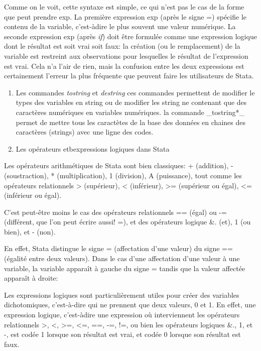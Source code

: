 \documentclass[
]{book}
\begin{document}
Comme on le voit, cette syntaxe est simple, ce qui n'est pas le cas de la forme que peut prendre exp. La première expression exp (après le signe =) spécifie le contenu de la variable, c'est-àdire le plus souvent une valeur numérique. La seconde expression exp (après \emph{if}) doit être formulée comme une expression logique dont le résultat est soit vrai soit faux: la création (ou le remplacement) de la variable est restreint aux observations pour lesquelles le résultat de l'expression est vrai. Cela n'a l'air de rien, mais la confusion entre les deux expressions est certainement l'erreur la plus fréquente que peuvent faire les utilisateurs de Stata.

\begin{enumerate}
\def\labelenumi{(\arabic{enumi})}
\setcounter{enumi}{2}
\item
  Les commandes \emph{tostring} et \emph{destring}
  ces commandes permettent de modifier le types des variables en string ou de modifier les string ne contenant que des caractères numériques en variables numériques.
  la commande \_tostring*\_ permet de mettre tous les caractètes de la base des données en chaines des caractères (strings) avec une ligne des codes.
\item
  Les opérateurs etbexpressions logiques dans Stata
\end{enumerate}

Les opérateurs arithmétiques de Stata sont bien classiques:
+ (addition), - (soustraction), * (multiplication), 1 (division),
A (puissance), tout comme les opérateurs relationnels
\textgreater{} (supérieur), \textless{} (inférieur), \textgreater= (supérieur ou égal), \textless= (inférieur
ou égal).

C'est peut-être moins le cas des opérateurs relationnels == (égal)
ou -= (différent, que l'on peut écrire aussi! =), et des opérateurs
logique \&. (et), 1 (ou bien), et - (non).

En effet, Stata distingue le signe = (affectation d'une valeur) du
signe == (égalité entre deux valeurs). Dans le cas d'une
affectation d'une valeur à une variable, la variable apparaît à
gauche du signe = tandis que la valeur affectée apparaît à droite:

Les expressions logiques sont particulièrement utiles pour créer
des variables dichotomiques, c'est-à-dire qui ne prennent que
deux valeurs, 0 et 1. En effet, une expression logique, c'est-àdire
une expression où interviennent les opérateurs relationnels
\textgreater, \textless, \textgreater=, \textless=, ==, -=, !=, ou bien les opérateurs logiques \&., 1, et
-, est codée 1 lorsque son résultat est vrai, et codée 0 lorsque
son résultat est faux.
\end{document}
